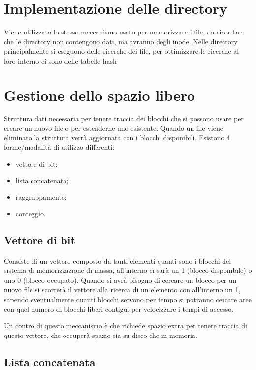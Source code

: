\documentclass[a4paper, 12pt]{book}
\begin{document}
\section{Implementazione delle directory}

Viene utilizzato lo stesso meccanismo usato per memorizzare 
i file, da ricordare che le directory non contengono dati, 
ma avranno degli inode. Nelle directory principalmente 
si eseguono delle ricerche dei file, per ottimizzare 
le ricerche al loro interno ci sono delle tabelle hash

\section{Gestione dello spazio libero}

Struttura dati necessaria per tenere traccia dei 
blocchi che si possono usare per creare un nuovo file 
o per estenderne uno esistente. Quando un file viene 
eliminato la struttura verrà aggiornata con i blocchi 
disponibili. Esistono 4 forme/modalità di utilizzo differenti:
\begin{itemize}
    \item vettore di bit;
    \item lista concatenata;
    \item raggruppamento;
    \item conteggio.
\end{itemize}

\subsection{Vettore di bit} 

Consiste di un vettore composto da tanti elementi quanti 
sono i blocchi del sistema di memorizzazione di massa, 
all'interno ci sarà un 1 (blocco disponibile) o uno 0 
(blocco occupato). Quando si avrà bisogno di cercare un
blocco per un nuovo file si scorrerà il vettore alla 
ricerca di un elemento con all'interno un 1, sapendo 
eventualmente quanti blocchi servono per tempo si potranno
cercare aree con quel numero di blocchi liberi contigui 
per velocizzare i tempi di accesso.

Un contro di questo meccanismo è che richiede spazio extra 
per tenere traccia di questo vettore, che occuperà spazio 
sia su disco che in memoria. 

\subsection{Lista concatenata}
\end{document}
